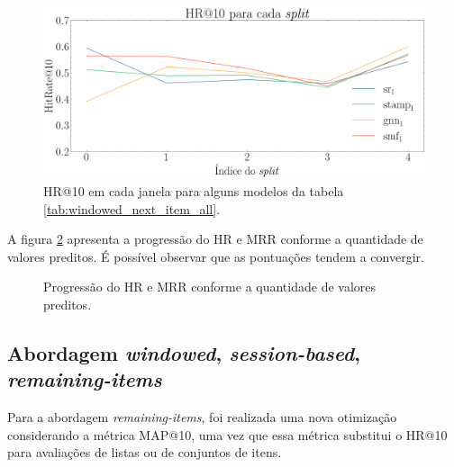 \begin{figure}[htbp]
  \centering
  \includegraphics[width=1\textwidth]{chapters/chap04/images/hr10_splits.png}
  \caption{HR@10 em cada janela para alguns modelos da tabela
  \ref{tab:windowed_next_item_all}.}
  \label{fig:next-item-single}
\end{figure}


A figura \ref{fig:progressao} apresenta a progressão do HR e MRR conforme a
quantidade de valores preditos. É possível observar que as pontuações tendem
a convergir.


\begin{figure}[htbp]
  \hfill
  \hfill
  \hfill
  \caption{Progressão do HR e MRR conforme a quantidade de valores preditos.}
  \label{fig:progressao}
  \end{figure}

\subsection{Abordagem \textit{windowed}, \textit{session-based}, \textit{remaining-items}}
Para a abordagem \textit{remaining-items}, foi realizada uma nova otimização
considerando a métrica MAP@10, uma vez que essa métrica substitui o HR@10 para
avaliações de listas ou de conjuntos de itens.

